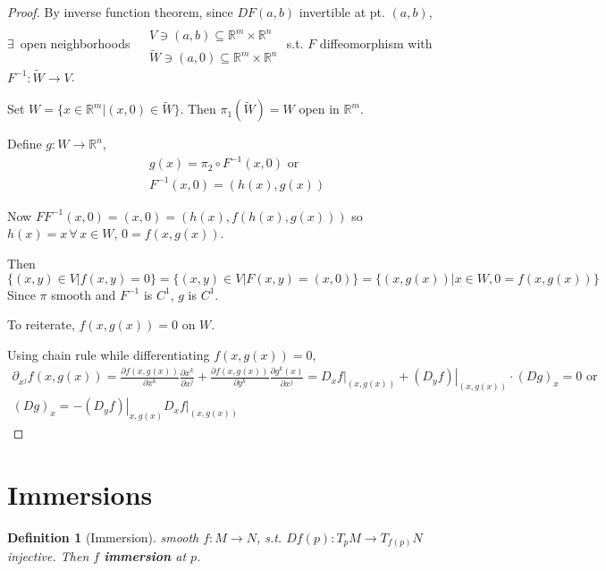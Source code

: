 \documentclass[10pt]{amsart}
\newtheorem{definition}{Definition}
\begin{document}
\begin{multicols*}{2}
\begin{proof}
By inverse function theorem, since $DF(a,b)$ invertible at pt. $(a,b)$, \\
$\exists \, $ open neighborhoods $\begin{aligned} & \quad \\
  & V \ni (a,b) \subseteq \mathbb{R}^m \times \mathbb{R}^n \\
  & \widetilde{W} \ni (a,0) \subseteq \mathbb{R}^m \times \mathbb{R}^n \end{aligned}$ s.t. $F$ diffeomorphism with $F^{-1}: \widetilde{W} \to V$. 

Set $W = \lbrace x \in \mathbb{R}^m | (x,0) \in \widetilde{W}\rbrace$.  Then $\pi_1(\widetilde{W}) =W$ open in $\mathbb{R}^m$.  

Define $g:W\to \mathbb{R}^n$, 
\[
\begin{aligned}
  & g(x) = \pi_2 \circ F^{-1}(x,0) \text{ or } \\ 
  & F^{-1}(x,0) = (h(x),g(x))
\end{aligned}
\]

Now $FF^{-1}(x,0) = (x,0) = (h(x), f(h(x),g(x)) )$ so $h(x)=x \, \forall \, x \in W$, $0 = f(x,g(x))$.  

Then
\[
\lbrace (x,y) \in V | f(x,y) = 0 \rbrace = \lbrace (x,y) \in V | F(x,y) = (x,0) \rbrace = \lbrace (x,g(x)) | x \in W, 0 = f(x,g(x)) \rbrace
\]
Since $\pi$ smooth and $F^{-1}$ is $C^1$, $g$ is $C^1$.  

To reiterate, $f(x,g(x)) =0$ on $W$.

Using chain rule while differentiating $f(x,g(x))=0$, 
\[
\begin{gathered}
\partial_{x^j} f(x,g(x)) = \frac{ \partial f(x,g(x)) }{ \partial x^k} \frac{ \partial x^k}{ \partial x^j}+ \frac{ \partial f(x,g(x))}{ \partial y^k}\frac{ \partial g^k(x)}{\partial x^j} = \left. D_x f \right|_{(x,g(x))} + \left. (D_yf) \right|_{(x,g(x))} \cdot (Dg)_x = 0 \text{ or }  \\
(Dg)_x = -\left. (D_yf) \right|_{x,g(x)} \left. D_xf \right|_{(x,g(x))}
\end{gathered}
\]



\end{proof}

\section{Immersions}

\begin{definition}[Immersion]
  smooth $f:M \to N$, s.t. $Df(p) : T_pM \to T_{f(p)}N$ injective.  Then $f$ \textbf{immersion} at $p$.  
\end{definition}


\end{multicols*}
\end{document}
